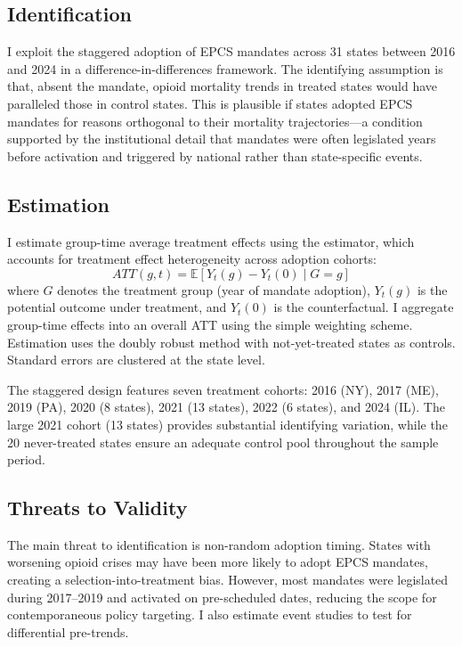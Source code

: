 \documentclass[12pt]{article}
\newcommand{\E}{\mathbb{E}}
\begin{document}
\subsection{Identification}

I exploit the staggered adoption of EPCS mandates across 31 states between 2016 and 2024 in a difference-in-differences framework. The identifying assumption is that, absent the mandate, opioid mortality trends in treated states would have paralleled those in control states. This is plausible if states adopted EPCS mandates for reasons orthogonal to their mortality trajectories---a condition supported by the institutional detail that mandates were often legislated years before activation and triggered by national rather than state-specific events.

\subsection{Estimation}

I estimate group-time average treatment effects using the \citet{callaway2021} estimator, which accounts for treatment effect heterogeneity across adoption cohorts:
\begin{equation}
ATT(g,t) = \E[Y_{t}(g) - Y_{t}(0) \mid G = g]
\end{equation}
where $G$ denotes the treatment group (year of mandate adoption), $Y_t(g)$ is the potential outcome under treatment, and $Y_t(0)$ is the counterfactual. I aggregate group-time effects into an overall ATT using the simple weighting scheme. Estimation uses the doubly robust method with not-yet-treated states as controls. Standard errors are clustered at the state level.

The staggered design features seven treatment cohorts: 2016 (NY), 2017 (ME), 2019 (PA), 2020 (8 states), 2021 (13 states), 2022 (6 states), and 2024 (IL). The large 2021 cohort (13 states) provides substantial identifying variation, while the 20 never-treated states ensure an adequate control pool throughout the sample period.

\subsection{Threats to Validity}

The main threat to identification is non-random adoption timing. States with worsening opioid crises may have been more likely to adopt EPCS mandates, creating a selection-into-treatment bias. However, most mandates were legislated during 2017--2019 and activated on pre-scheduled dates, reducing the scope for contemporaneous policy targeting. I also estimate event studies to test for differential pre-trends.
\end{document}
